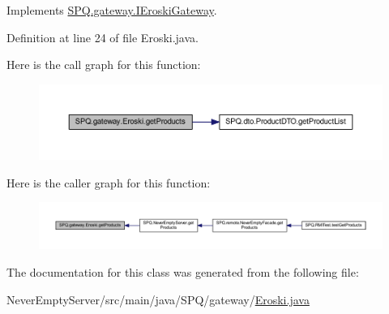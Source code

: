 Implements \mbox{\hyperlink{interface_s_p_q_1_1gateway_1_1_i_eroski_gateway_a6263f66378bc39296c6ea003642d79b9}{S\+P\+Q.\+gateway.\+I\+Eroski\+Gateway}}.



Definition at line 24 of file Eroski.\+java.

Here is the call graph for this function\+:
\nopagebreak
\begin{figure}[H]
\begin{center}
\leavevmode
\includegraphics[width=350pt]{class_s_p_q_1_1gateway_1_1_eroski_acfd174565206c16fb55489786957b8de_cgraph}
\end{center}
\end{figure}
Here is the caller graph for this function\+:
\nopagebreak
\begin{figure}[H]
\begin{center}
\leavevmode
\includegraphics[width=350pt]{class_s_p_q_1_1gateway_1_1_eroski_acfd174565206c16fb55489786957b8de_icgraph}
\end{center}
\end{figure}


The documentation for this class was generated from the following file\+:\begin{DoxyCompactItemize}
\item 
Never\+Empty\+Server/src/main/java/\+S\+P\+Q/gateway/\mbox{\hyperlink{_eroski_8java}{Eroski.\+java}}\end{DoxyCompactItemize}
